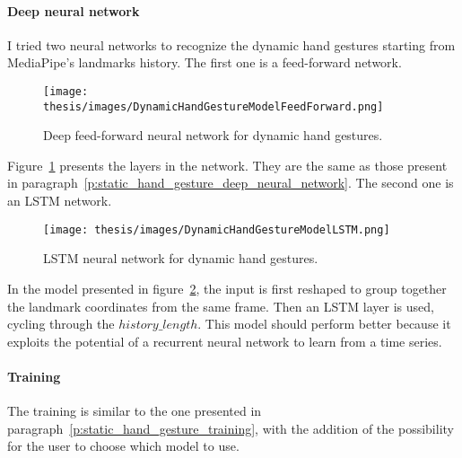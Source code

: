 \documentclass[../thesis.tex]{subfiles}
\begin{document}
\paragraph{Deep neural network}
I tried two neural networks to recognize the dynamic hand gestures starting from MediaPipe's landmarks history. The first one is a feed-forward network.
\begin{figure}[H]
    \centering
    \texttt{[image: thesis/images/DynamicHandGestureModelFeedForward.png]}
    \caption{Deep feed-forward neural network for dynamic hand gestures.}
    \label{fig:ff_model_dynamic_hand_gestures}
\end{figure}
Figure~\ref{fig:ff_model_dynamic_hand_gestures} presents the layers in the network.  They are the same as those present in paragraph~\ref{p:static_hand_gesture_deep_neural_network}.
The second one is an \acrshort{LSTM} network.
\begin{figure}[H]
    \centering
    \texttt{[image: thesis/images/DynamicHandGestureModelLSTM.png]}
    \caption{\acrshort{LSTM} neural network for dynamic hand gestures.}
    \label{fig:lstm_model_dynamic_hand_gestures}
\end{figure}
In the model presented in figure~\ref{fig:lstm_model_dynamic_hand_gestures}, the input is first reshaped to group together the landmark coordinates from the same frame. Then an LSTM layer is used, cycling through the  $history\_length$. This model should perform better because it exploits the potential of a recurrent neural network to learn from a time series.

\paragraph{Training}
The training is similar to the one presented in paragraph~\ref{p:static_hand_gesture_training}, with the addition of the possibility for the user to choose which model to use.
\end{document}
